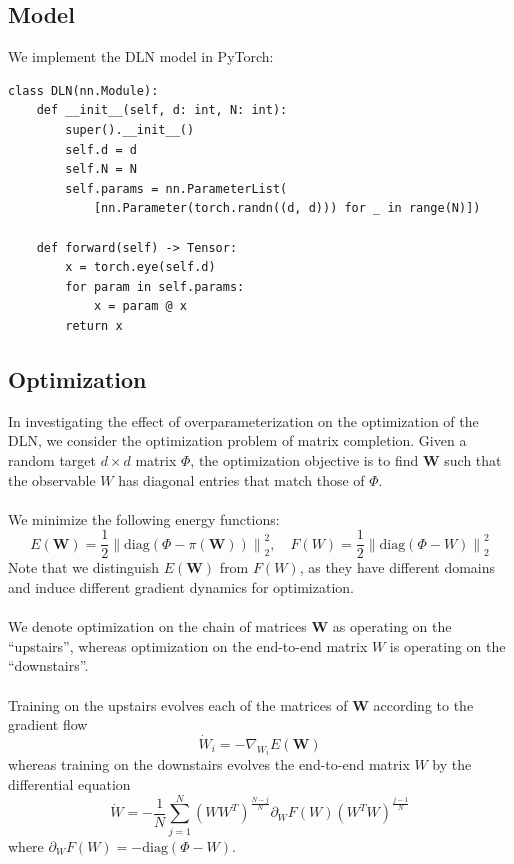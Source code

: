 \documentclass[11pt]{article}
\newcommand{\norm}[2][2]{\left\lVert #2 \right\rVert_{#1}}
\begin{document}
\subsection{Model}
We implement the DLN model in PyTorch:
\begin{verbatim}
class DLN(nn.Module):
    def __init__(self, d: int, N: int):
        super().__init__()
        self.d = d
        self.N = N
        self.params = nn.ParameterList(
            [nn.Parameter(torch.randn((d, d))) for _ in range(N)])

    def forward(self) -> Tensor:
        x = torch.eye(self.d)
        for param in self.params:
            x = param @ x
        return x
\end{verbatim}
\subsection{Optimization}
In investigating the effect of overparameterization on the optimization of the DLN, we consider the optimization problem of matrix completion. Given a random target $d \times d$ matrix $\Phi$, the optimization objective is to find $\bm{W}$ such that the observable $W$ has diagonal entries that match those of $\Phi$.
\\\\
We minimize the following energy functions:
$$E(\bm{W}) = \frac{1}{2} \norm{\text{diag}\left(\Phi - \pi\left(\bm{W}\right)\right)}^2,\quad F(W) = \frac{1}{2} \norm{\text{diag}\left(\Phi - W\right)}^2$$
Note that we distinguish $E\left(\bm{W}\right)$ from $F(W)$, as they have different domains and induce different gradient dynamics for optimization.
\\\\
We denote optimization on the chain of matrices $\bm{W}$ as operating on the ``upstairs'', whereas optimization on the end-to-end matrix $W$ is operating on the ``downstairs''.
\\\\
Training on the upstairs evolves each of the matrices of $\bm{W}$ according to the gradient flow
$$\dot{W}_i = -\nabla_{W_i}E\left(\bm{W}\right)$$
whereas training on the downstairs evolves the end-to-end matrix $W$ by the differential equation
\begin{equation} \label{eq:downstairs}
    \dot{W} = -\frac{1}{N}\sum_{j=1}^N \left(WW^T\right)^{\frac{N - j}{N}} \partial_WF\left(W\right)\left(W^TW\right)^\frac{j - 1}{N}
\end{equation}
where $\partial_WF\left(W\right) = -\text{diag}\left(\Phi - W\right)$.
\end{document}
